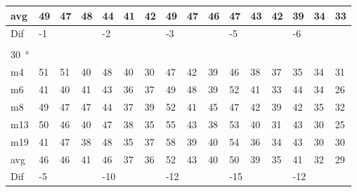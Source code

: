 \begin{table}[H]
\begin{tabular}{l|l|l|l|l|l|l|l|l|l|l|l|l|lll}
avg & 49     &  47    &  48    &  44    &  41    &   42   &  49    &  47     & 46     &  47     &  43    &   42   & \multicolumn{1}{l|}{39} & \multicolumn{1}{l|}{34}  &33  \\ \hline  
Dif & \multicolumn{3}{l|}{-1} & \multicolumn{3}{l|}{-2} & \multicolumn{3}{l|}{-3} & \multicolumn{3}{l|}{-5} & \multicolumn{3}{l}{-6}  \\ 
 \multicolumn{16}{l}{ } \\                         
\SI{30}{\degree}   & \multicolumn{3}{l|}{} & \multicolumn{3}{l|}{} & \multicolumn{3}{l|}{} & \multicolumn{3}{l|}{} & \multicolumn{3}{l}{}   \\  \hline
m4    &  51    &  51    & 40     & 48     &  40    &   30   &   47   &   42    &  39    &   46    &   38   &   37   & \multicolumn{1}{l|}{35} & \multicolumn{1}{l|}{34} & 31 \\
m6    &  41    &   40   &  41    & 43     &   36   &  37    &    49  &   48    &  39    &   52    &   41   &   33   & \multicolumn{1}{l|}{44} & \multicolumn{1}{l|}{34} & 26 \\
m8    &  49    &  47    & 47     &  44    &  37    &   39   &   52   &   41    &  45    &   47    &    42  &   39   & \multicolumn{1}{l|}{42} & \multicolumn{1}{l|}{35} & 32 \\
m13  &   50   & 46     &   40   & 47     &   38   &   35   &   55   &   43    &  38    &   53    &   40   &   31   & \multicolumn{1}{l|}{43} & \multicolumn{1}{l|}{30} & 25 \\
m19  &  41    &  47    &  38    &  48    &  35    &   37   &   58   &    39   &  40    &   54    &   36   &    34  & \multicolumn{1}{l|}{43} & \multicolumn{1}{l|}{30} & 30 \\ \hline
avg &  46    &   46   &  41    &  46    &  37    & 36     &  52    &   43    & 40     &   50    & 39     &   35   & \multicolumn{1}{l|}{41} & \multicolumn{1}{l|}{32}  &29  \\ \hline  
Dif & \multicolumn{3}{l|}{-5} & \multicolumn{3}{l|}{-10} & \multicolumn{3}{l|}{-12} & \multicolumn{3}{l|}{-15} & \multicolumn{3}{l}{-12}                                
\end{tabular}
\end{table}


